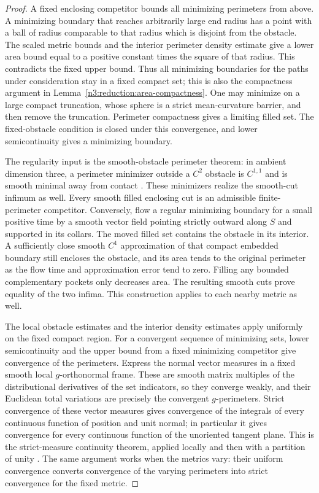 \begin{proof}
A fixed enclosing competitor bounds all minimizing perimeters from
above.  A minimizing boundary that reaches arbitrarily large end
radius has a point with a ball of radius comparable to that radius
which is disjoint from the obstacle.  The scaled metric bounds and the
interior perimeter density estimate give a lower area bound equal to
a positive constant times the square of that radius.  This contradicts
the fixed upper bound.  Thus all minimizing boundaries for the paths
under consideration stay in a fixed compact set; this is also the
compactness argument in Lemma~\ref{n3:reduction:area-compactness}.
One may minimize on a large compact truncation, whose sphere is a
strict mean-curvature barrier, and then remove the truncation.
Perimeter compactness gives a limiting filled set.  The fixed-obstacle
condition is closed under this convergence, and lower
semicontinuity gives a minimizing boundary.

The regularity input is the smooth-obstacle perimeter theorem:
in ambient dimension three, a perimeter minimizer outside a $C^2$
obstacle is $C^{1,1}$ and is smooth minimal away from contact
\cite[Regularity Theorem 1.3(iii)]{HuiskenIlmanen2001}.
These minimizers realize the smooth-cut infimum as well.  Every smooth
filled enclosing cut is an admissible finite-perimeter competitor.
Conversely, flow a regular minimizing boundary for a small positive
time by a smooth vector field pointing strictly outward along $S$ and
supported in its collars.  The moved filled set contains the obstacle
in its interior.  A sufficiently close smooth $C^1$ approximation of
that compact embedded boundary still encloses the obstacle, and its
area tends to the original perimeter as the flow time and approximation
error tend to zero.  Filling any bounded complementary pockets only
decreases area.  The resulting smooth cuts prove equality of the two
infima.  This construction applies to each nearby metric as well.

The local obstacle estimates and the interior density estimates apply uniformly
on the fixed compact region.  For a convergent sequence of minimizing
sets, lower semicontinuity and the upper bound from a fixed minimizing
competitor give convergence of the perimeters.  Express the normal
vector measures in a fixed smooth local $g$-orthonormal frame.  These
are smooth matrix multiples of the distributional derivatives of the
set indicators, so they converge weakly, and their Euclidean total
variations are precisely the convergent $g$-perimeters.
Strict convergence of these vector measures gives convergence of the
integrals of every continuous function of position and unit normal;
in particular it gives convergence for every continuous function of
the unoriented tangent plane.  This is the strict-measure continuity
theorem, applied locally and then with a partition of unity
\cite{AmbrosioFuscoPallara2000}.  The same argument works when the
metrics vary: their uniform convergence converts convergence of the
varying perimeters into strict convergence for the fixed metric.


\end{proof}
